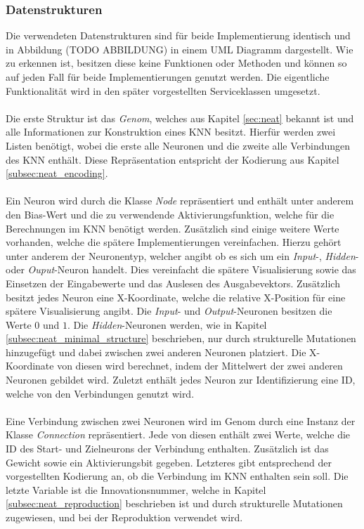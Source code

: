 \subsubsection{Datenstrukturen}
Die verwendeten Datenstrukturen sind für beide Implementierung identisch und in Abbildung (TODO ABBILDUNG) in einem UML Diagramm dargestellt. Wie zu erkennen ist, besitzen diese keine Funktionen oder Methoden und können so auf jeden Fall für beide Implementierungen genutzt werden. Die eigentliche Funktionalität wird in den später vorgestellten Serviceklassen umgesetzt.
\\\\
Die erste Struktur ist das \emph{Genom}, welches aus Kapitel \ref{sec:neat} bekannt ist und alle Informationen zur Konstruktion eines \ac{KNN} besitzt. Hierfür werden zwei Listen benötigt, wobei die erste alle Neuronen und die zweite alle Verbindungen des \ac{KNN} enthält. Diese Repräsentation entspricht der Kodierung aus Kapitel \ref{subsec:neat_encoding}. 
\\\\
Ein Neuron wird durch die Klasse \emph{Node} repräsentiert und enthält unter anderem den Bias-Wert und die zu verwendende Aktivierungsfunktion, welche für die Berechnungen im \ac{KNN} benötigt werden. Zusätzlich sind einige weitere Werte vorhanden, welche die spätere Implementierungen vereinfachen. Hierzu gehört unter anderem der Neuronentyp, welcher angibt ob es sich um ein \emph{Input}-, \emph{Hidden}- oder \emph{Ouput}-Neuron handelt. Dies vereinfacht die spätere Visualisierung sowie das Einsetzen der Eingabewerte und das Auslesen des Ausgabevektors. Zusätzlich besitzt jedes Neuron eine X-Koordinate, welche die relative X-Position für eine spätere Visualisierung angibt. Die \emph{Input}- und \emph{Output}-Neuronen besitzen die Werte $0$ und $1$. Die \emph{Hidden}-Neuronen werden, wie in Kapitel \ref{subsec:neat_minimal_structure} beschrieben, nur durch strukturelle Mutationen hinzugefügt und dabei zwischen zwei anderen Neuronen platziert. Die X-Koordinate von diesen wird berechnet, indem der Mittelwert der zwei anderen Neuronen gebildet wird. Zuletzt enthält jedes Neuron zur Identifizierung eine ID, welche von den Verbindungen genutzt wird.
\\\\
Eine Verbindung zwischen zwei Neuronen wird im Genom durch eine Instanz der Klasse \emph{Connection} repräsentiert. Jede von diesen enthält zwei Werte, welche die ID des Start- und Zielneurons der Verbindung enthalten. Zusätzlich ist das Gewicht sowie ein Aktivierungsbit gegeben. Letzteres gibt entsprechend der vorgestellten Kodierung an, ob die Verbindung im \ac{KNN} enthalten sein soll. Die letzte Variable ist die Innovationsnummer, welche in Kapitel \ref{subsec:neat_reproduction} beschrieben ist und durch strukturelle Mutationen zugewiesen, und bei der Reproduktion verwendet wird.
